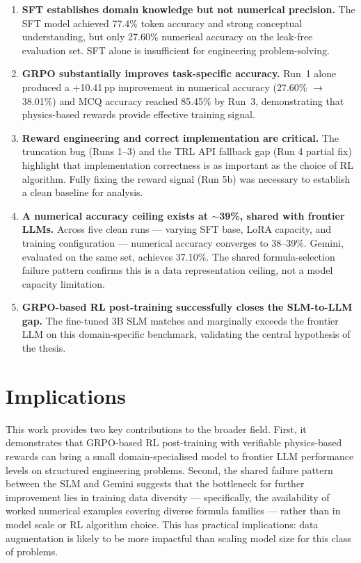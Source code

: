 \documentclass[12pt]{report}
\begin{document}
\begin{enumerate}
    \item \textbf{SFT establishes domain knowledge but not numerical precision.} The SFT model achieved 77.4\% token accuracy and strong conceptual understanding, but only 27.60\% numerical accuracy on the leak-free evaluation set. SFT alone is insufficient for engineering problem-solving.
    
    \item \textbf{GRPO substantially improves task-specific accuracy.} Run~1 alone produced a +10.41\,pp improvement in numerical accuracy (27.60\% $\rightarrow$ 38.01\%) and MCQ accuracy reached 85.45\% by Run~3, demonstrating that physics-based rewards provide effective training signal.
    
    \item \textbf{Reward engineering and correct implementation are critical.} The truncation bug (Runs 1--3) and the TRL API fallback gap (Run 4 partial fix) highlight that implementation correctness is as important as the choice of RL algorithm. Fully fixing the reward signal (Run 5b) was necessary to establish a clean baseline for analysis.

    \item \textbf{A numerical accuracy ceiling exists at $\sim$39\%, shared with frontier LLMs.} Across five clean runs --- varying SFT base, LoRA capacity, and training configuration --- numerical accuracy converges to 38--39\%. Gemini, evaluated on the same set, achieves 37.10\%. The shared formula-selection failure pattern confirms this is a data representation ceiling, not a model capacity limitation.
    
    \item \textbf{GRPO-based RL post-training successfully closes the SLM-to-LLM gap.} The fine-tuned 3B SLM matches and marginally exceeds the frontier LLM on this domain-specific benchmark, validating the central hypothesis of the thesis.
\end{enumerate}

\section{Implications}

This work provides two key contributions to the broader field. First, it demonstrates that GRPO-based RL post-training with verifiable physics-based rewards can bring a small domain-specialised model to frontier LLM performance levels on structured engineering problems. Second, the shared failure pattern between the SLM and Gemini suggests that the bottleneck for further improvement lies in training data diversity --- specifically, the availability of worked numerical examples covering diverse formula families --- rather than in model scale or RL algorithm choice. This has practical implications: data augmentation is likely to be more impactful than scaling model size for this class of problems.
\end{document}
